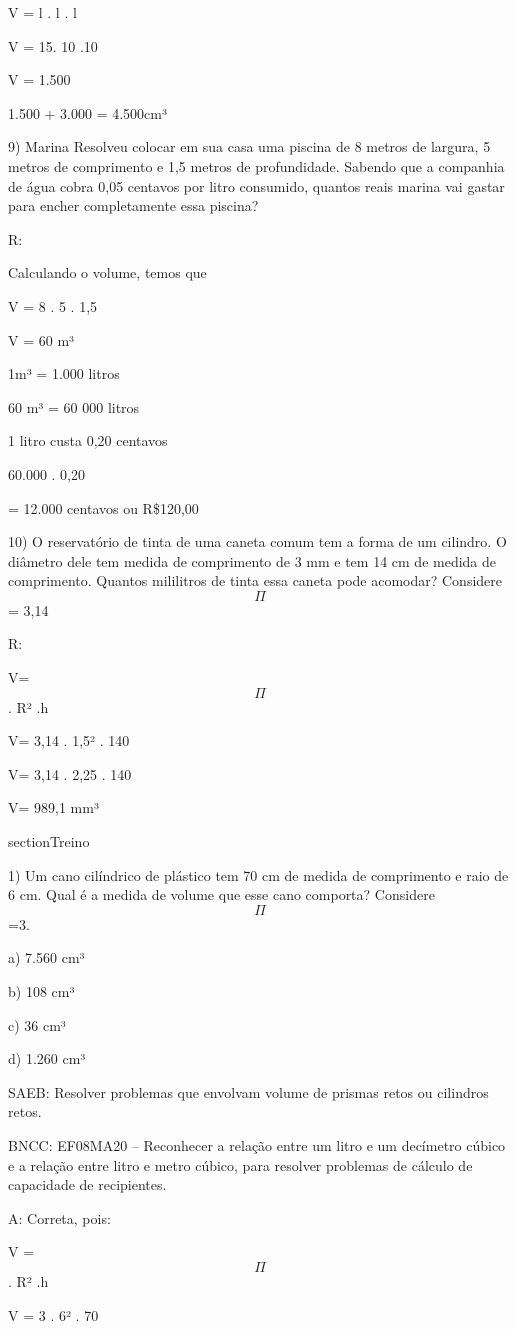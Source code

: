 V = l . l . l

V = 15. 10 .10

V = 1.500

1.500 + 3.000 = 4.500cm³

9) Marina Resolveu colocar em sua casa uma piscina de 8 metros de
largura, 5 metros de comprimento e 1,5 metros de profundidade. Sabendo
que a companhia de água cobra 0,05 centavos por litro consumido, quantos
reais marina vai gastar para encher completamente essa piscina?

R:

Calculando o volume, temos que

V = 8 . 5 . 1,5

V = 60 m³

1m³ = 1.000 litros

60 m³ = 60 000 litros

1 litro custa 0,20 centavos

60.000 . 0,20

= 12.000 centavos ou R\$120,00

10) O reservatório de tinta de uma caneta comum tem a forma de um
cilindro. O diâmetro dele tem medida de comprimento de 3 mm e tem 14 cm
de medida de comprimento. Quantos mililitros de tinta essa caneta pode
acomodar? Considere \[\Pi\] = 3,14

R:

V= \[\Pi\] . R² .h

V= 3,14 . 1,5² . 140

V= 3,14 . 2,25 . 140

V= 989,1 mm³

section{Treino}

1) Um cano cilíndrico de plástico tem 70 cm de medida de comprimento e
raio de 6 cm. Qual é a medida de volume que esse cano comporta?
Considere \[\Pi\]=3.

a) 7.560 cm³

b) 108 cm³

c) 36 cm³

d) 1.260 cm³

SAEB: Resolver problemas que envolvam volume de prismas retos ou
cilindros retos.

BNCC: EF08MA20 -- Reconhecer a relação entre um litro e um decímetro
cúbico e a relação entre litro e metro cúbico, para resolver problemas
de cálculo de capacidade de recipientes.

A: Correta, pois:

V = \[\Pi\] . R² .h

V = 3 . 6² . 70

